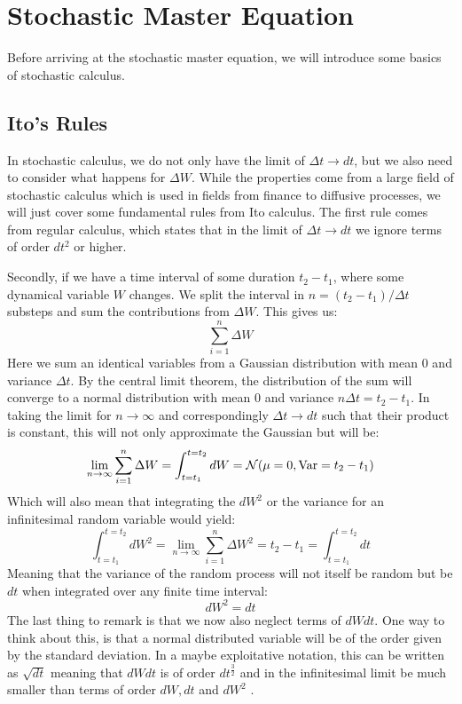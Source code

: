\section{Stochastic Master Equation}
Before arriving at the stochastic master equation, we will introduce some basics of stochastic calculus.

\subsection{Ito's Rules}
In stochastic calculus, we do not only have the limit of $\Delta t \to dt$, but we also need to consider what happens for $\Delta W$. While the properties come from a large field of stochastic calculus which is used in fields from finance to diffusive processes, we will just cover some fundamental rules from Ito calculus. The first rule comes from regular calculus, which states that in the limit of $\Delta t \to dt$ we ignore terms of order $dt^2$ or higher. 

Secondly, if we have a time interval of some duration $t_2 - t_1$, where some dynamical variable $W$ changes. We split the interval in $n = (t_2 - t_1)/\Delta t$ substeps and sum the contributions from $\Delta W$. This gives us:
\begin{equation}
    \sum_{i=1}^n \Delta W
\end{equation}
Here we sum an identical variables from a Gaussian distribution with mean $0$ and variance $\Delta t$. By the central limit theorem, the distribution of the sum will converge to a normal distribution with mean $0$ and variance $n \Delta{t} = t_2 - t_1$. In taking the limit for $n \to \infty$ and correspondingly $\Delta t \to dt$ such that their product is constant, this will not only approximate the Gaussian but will be:
\begin{equation}
    \lim_{n \to \infty} \sum_{i=1}^n \Delta W = \int_{t = t_1}^{t = t_2} dW = \mathcal{N}(\mu = 0, \operatorname{Var} = t_2 - t_1)
\end{equation}
Which will also mean that integrating the $dW^2$ or the variance for an infinitesimal random variable would yield:
\begin{equation}
    \int_{t = t_1}^{t = t_2} dW^2 =  \lim_{n \to \infty} \sum_{i=1}^n \Delta W^2 = t_2 - t_1 = \int_{t = t_1}^{t = t_2} dt
\end{equation}
Meaning that the variance of the random process will not itself be random but be $dt$ when integrated over any finite time interval: 
\begin{equation}
    dW^2 = dt
\end{equation}
The last thing to remark is that we now also neglect terms of $dWdt$. One way to think about this, is that a normal distributed variable will be of the order given by the standard deviation. In a maybe exploitative notation, this can be written as $\sqrt{dt}$ meaning that $dWdt$ is of order $dt^\frac32$ and in the infinitesimal limit be much smaller than terms of order $dW, dt$ and $dW^2$ \cite{gheorghiu_ito_nodate}.

